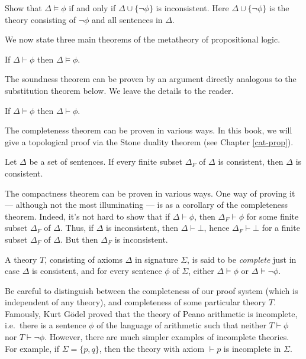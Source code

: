 \begin{exercise} Show that $\Delta\vDash\phi$ if and only if
  $\Delta\cup \{ \neg \phi \}$ is inconsistent.  Here $\Delta\cup \{
  \neg \phi \}$ is the theory consisting of $\neg\phi$ and all
  sentences in $\Delta$. \end{exercise}

We now state three main theorems of the metatheory of propositional
logic.

\begin{thm}[Soundness] If $\Delta\vdash\phi$ then
  $\Delta\vDash\phi$. \end{thm}

The soundness theorem can be proven by an argument directly analogous
to the substitution theorem below.  We leave the details to the
reader.

\begin{thm}[Completeness] If $\Delta\vDash\phi$ then
  $\Delta\vdash\phi$.  \end{thm}

The completeness theorem can be proven in various ways.  In this book,
we will give a topological proof via the Stone duality theorem (see
Chapter \ref{cat-prop}).

\begin{thm}[Compactness] Let $\Delta$ be a set of sentences.  If every
  finite subset $\Delta _F$ of $\Delta$ is consistent, then $\Delta$
  is consistent.  \end{thm}

The compactness theorem can be proven in various ways.  One way of
proving it --- although not the most illuminating --- is as a
corollary of the completeness theorem.  Indeed, it's not hard to show
that if $\Delta\vdash\phi$, then $\Delta _F\vdash\phi$ for some finite
subset $\Delta _F$ of $\Delta$.  Thus, if $\Delta$ is inconsistent,
then $\Delta\vdash\bot$, hence $\Delta _F\vdash\bot$ for a finite
subset $\Delta _F$ of $\Delta$.  But then $\Delta _F$ is inconsistent.

\begin{defn} A theory $T$, consisting of axioms $\Delta$ in signature
  $\Sigma$, is said to be \emph{complete} just in case $\Delta$ is
  consistent, and for every sentence $\phi$ of $\Sigma$, either
  $\Delta\vDash \phi$ or $\Delta\vDash \neg \phi$. \end{defn}

Be careful to distinguish between the completeness of our proof system
(which is independent of any theory), and completeness of some
particular theory $T$.  Famously, Kurt G{\"o}del proved that the
theory of Peano arithmetic is incomplete, i.e.\ there is a sentence
$\phi$ of the language of arithmetic such that neither $T\vdash\phi$
nor $T\vdash\neg\phi$.  However, there are much simpler examples of
incomplete theories.  For example, if $\Sigma = \{ p,q\}$, then the
theory with axiom $\vdash p$ is incomplete in $\Sigma$.  

